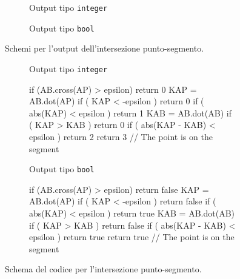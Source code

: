 \begin{figure}[h!]
	\hfill
	\begin{subfigure}{.45\textwidth}
		\centering
		\caption{Output tipo \texttt{integer}}
	\end{subfigure}
	\hfill
	\begin{subfigure}{.45\textwidth}
		\centering
		\caption{Output tipo \texttt{bool}}
	\end{subfigure}
	\hfill
	\caption{Schemi per l'output dell'intersezione punto-segmento.}
\end{figure}

\begin{figure}[h!]
	\hfill
	\begin{subfigure}[t]{.45\linewidth}
	\raggedright
	Output tipo \texttt{integer}\\
	\vspace{.5em}
	\begin{pseudoc}
	if (AB.cross(AP) > epsilon) { return 0 }
	KAP = AB.dot(AP)
	if ( KAP      < -epsilon ) { return 0 }
	if ( abs(KAP) < epsilon  ) { return 1 }
	KAB = AB.dot(AB)
	if ( KAP > KAB )  { return 0 }
	if ( abs(KAP - KAB) < epsilon ) { return 2 }
	return 3 // The point is on the segment
	\end{pseudoc}
	\end{subfigure}
	\hfill
	\begin{subfigure}[t]{.45\textwidth}
	\raggedright
	Output tipo \texttt{bool}\\
	\begin{pseudoc}
	if (AB.cross(AP) > epsilon) { return false }
	KAP = AB.dot(AP)
	if ( KAP      < -epsilon ) { return false }
	if ( abs(KAP) < epsilon  ) { return true }
	KAB = AB.dot(AB)
	if ( KAP > KAB )  { return false }
	if ( abs(KAP - KAB) < epsilon ) { return true }
	return true // The point is on the segment
	\end{pseudoc}
	\end{subfigure}
	\hfill
	\caption{Schema del codice per l'intersezione punto-segmento.}
	\label{pointsegment}
\end{figure}
%
